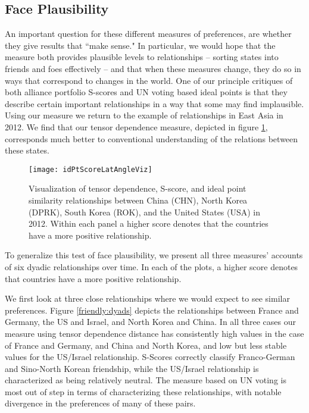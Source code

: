 \subsection*{Face Plausibility}

An important question for these different measures of preferences, are whether they give results that ``make sense." In particular, we would hope that the measure both provides plausible levels to relationships -- sorting states into friends and foes effectively -- and that when these measures change, they do so in ways that correspond to changes in the world. One of our principle critiques of both alliance portfolio S-scores and UN voting based ideal points is that they describe certain important relationships in a way that some may find implausible. Using our measure we return to the example of relationships in East Asia in 2012. We find that our tensor dependence measure, depicted in figure \ref{korea:withus}, corresponds much better to conventional understanding of the relations between these states.

\begin{figure}[ht]
\texttt{[image: idPtScoreLatAngleViz]}
\caption{Visualization of tensor dependence, S-score, and ideal point similarity relationships between China (CHN), North Korea (DPRK), South Korea (ROK), and the United States (USA) in 2012. Within each panel a higher score denotes that the countries have a more positive relationship.}
\label{korea:withus}
\end{figure}

To generalize this test of face plausibility, we present all three measures' accounts of six dyadic relationships over time. In each of the plots, a higher score denotes that countries have a more positive relationship.

We first look at three close relationships where we would expect to see similar preferences. Figure \ref{friendly:dyads} depicts the relationships between France and Germany, the US and Israel, and North Korea and China. In all three cases our measure using tensor dependence distance has consistently high values in the case of France and Germany, and China and North Korea, and low but less stable values for the US/Israel relationship. S-Scores correctly classify Franco-German and Sino-North Korean friendship, while the US/Israel relationship is characterized as being relatively neutral. The measure based on UN voting is most out of step in terms of characterizing these relationships, with notable divergence in the preferences of many of these pairs.

